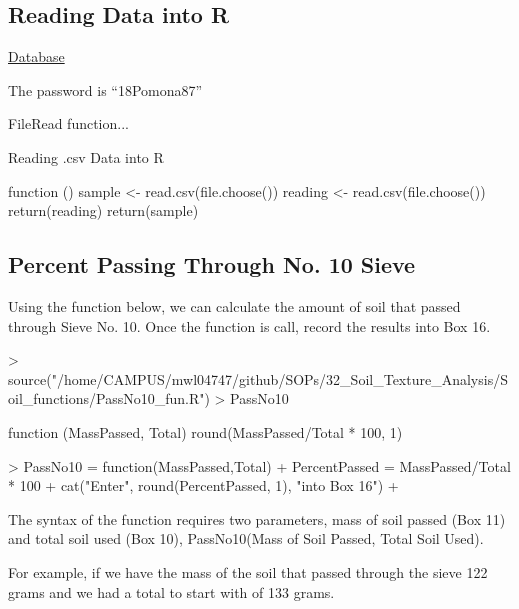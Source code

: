 
\subsection{Reading Data into R}

\href{http://thinkertools.org/grainsize/}{Database}

The password is ``18Pomona87''

FileRead function...



Reading .csv Data into R
\begin{Schunk}
\begin{Soutput}
function () 
{
    sample <- read.csv(file.choose())
    reading <- read.csv(file.choose())
    return(reading)
    return(sample)
}
\end{Soutput}
\end{Schunk}


\subsection{Percent Passing Through No. 10 Sieve}

Using the function below, we can calculate the amount of soil that passed through Sieve No. 10. Once the function is call, record the results into Box 16. 

\begin{Schunk}
\begin{Sinput}
> source("/home/CAMPUS/mwl04747/github/SOPs/32_Soil_Texture_Analysis/Soil_functions/PassNo10_fun.R")
> PassNo10
\end{Sinput}
\begin{Soutput}
function (MassPassed, Total) 
{
    round(MassPassed/Total * 100, 1)
}
\end{Soutput}
\end{Schunk}

\begin{Schunk}
\begin{Sinput}
> PassNo10 = function(MassPassed,Total){
+   PercentPassed = MassPassed/Total * 100
+   cat("Enter", round(PercentPassed, 1), "into Box 16")
+ }
\end{Sinput}
\end{Schunk}

The syntax of the function requires two parameters, mass of soil passed (Box 11) and total soil used (Box 10), PassNo10(Mass of Soil Passed, Total Soil Used). 

For example, if we have the mass of the soil that passed through the sieve 122 grams and we had a total to start with of 133 grams.

